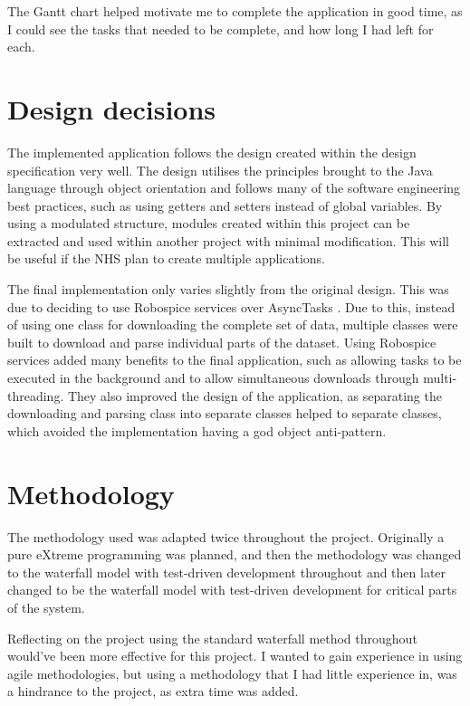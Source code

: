 The Gantt chart helped motivate me to complete the application in good time, as I could see the tasks that needed to be complete, and how long I had left for each.

\section{Design decisions}

The implemented application follows the design created within the design specification very well. The design utilises the principles brought to the Java language \cite{java} through object orientation and follows many of the software engineering best practices, such as using getters and setters instead of global variables. By using a modulated structure, modules created within this project can be extracted and used within another project with minimal modification. This will be useful if the NHS plan to create multiple applications.

The final implementation only varies slightly from the original design. This was due to deciding to use Robospice services \cite{robospice} over AsyncTasks \cite{async_task}. Due to this, instead of using one class for downloading the complete set of data, multiple classes were built to download and parse individual parts of the dataset. Using Robospice services added many benefits to the final application, such as allowing tasks to be executed in the background and to allow simultaneous downloads through multi-threading. They also improved the design of the application, as separating the downloading and parsing class into separate classes helped to separate classes, which avoided the implementation having a god object anti-pattern.


\section{Methodology}

The methodology used was adapted twice throughout the project. Originally a pure eXtreme programming \cite{xp} was planned, and then the methodology was changed to the waterfall model \cite{waterfall} with test-driven development \cite{tdd} throughout and then later changed to be the waterfall model with test-driven development for critical parts of the system.

Reflecting on the project using the standard waterfall \cite{waterfall} method throughout would’ve been more effective for this project. I wanted to gain experience in using agile methodologies, but using a methodology that I had little experience in, was a hindrance to the project, as extra time was added.

